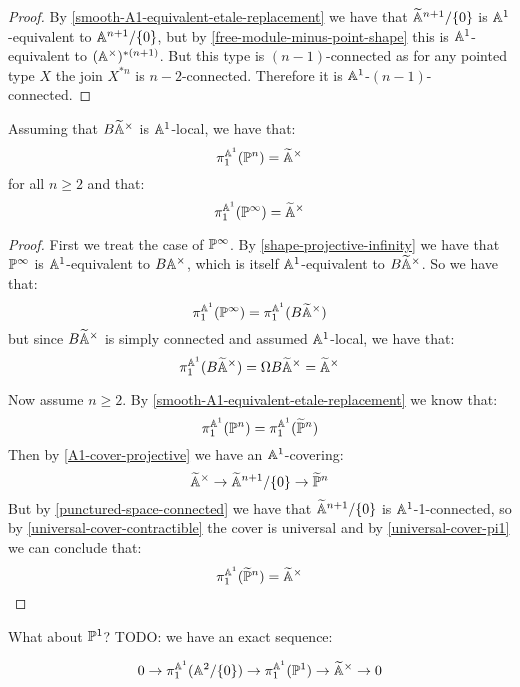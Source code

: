 \begin{proof}
By \cref{smooth-A1-equivalent-etale-replacement} we have that $\widetilde {\mathbb{A}}^{n+1}/\{0\}$ is $\mathbb{A}^1$-equivalent to $\mathbb{A}^{n+1}/\{0\}$, but by \cref{free-module-minus-point-shape} this is $\mathbb{A}^1$-equivalent to $(\mathbb{A}^\times)^{*(n+1)}$. But this type is $(n-1)$-connected as for any pointed type $X$ the join $X^{*n}$ is $n-2$-connected. Therefore it is $\mathbb{A}^1$-$(n-1)$-connected.
\end{proof}

\begin{lemma}
Assuming that $B\widetilde{\mathbb{A}}^\times$ is $\mathbb{A}^1$-local, we have that:
\[\pi^{\mathbb{A}^1}_1(\mathbb{P}^n) = \widetilde{\mathbb{A}}^\times\]
for all $n\geq 2$ and that:
\[\pi^{\mathbb{A}^1}_1(\mathbb{P}^\infty) = \widetilde{\mathbb{A}}^\times\]
\end{lemma}

\begin{proof}
First we treat the case of $\mathbb{P}^\infty$. By \cref{shape-projective-infinity} we have that $\mathbb{P}^\infty$ is $\mathbb{A}^1$-equivalent to $B\mathbb{A}^\times$, which is itself $\mathbb{A}^1$-equivalent to $B\widetilde{\mathbb{A}}^\times$. So we have that:
\[\pi_1^{\mathbb{A}^1}(\mathbb{P}^\infty) = \pi_1^{\mathbb{A}^1}(B\widetilde{\mathbb{A}}^\times)\]
but since $B\widetilde{\mathbb{A}}^\times$ is simply connected and assumed $\mathbb{A}^1$-local, we have that:
\[\pi_1^{\mathbb{A}^1}(B\widetilde{\mathbb{A}}^\times) = \Omega B\widetilde{\mathbb{A}}^\times = \widetilde{\mathbb{A}}^\times\]

Now assume $n\geq 2$. By \cref{smooth-A1-equivalent-etale-replacement} we know that:
\[\pi_1^{\mathbb{A}^1}(\mathbb{P}^n) = \pi_1^{\mathbb{A}^1}(\widetilde{\mathbb{P}}^n)\]
Then by \cref{A1-cover-projective} we have an $\mathbb{A}^1$-covering: 
\[\widetilde{\mathbb{A}}^\times \to \widetilde {\mathbb{A}}^{n+1}/\{0\} \to \widetilde{\mathbb{P}}^n\]
But by \cref{punctured-space-connected} we have that $\widetilde {\mathbb{A}}^{n+1}/\{0\}$ is $\mathbb{A}^1$-1-connected, so by \cref{universal-cover-contractible} the cover is universal and by \cref{universal-cover-pi1} we can conclude that:
\[\pi_1^{\mathbb{A}^1}(\widetilde{\mathbb{P}}^n) = \widetilde{\mathbb{A}}^\times\]
\end{proof}

What about $\mathbb{P}^1$? TODO: we have an exact sequence:

\[0\to \pi_1^{\mathbb{A}^1}(\mathbb{A}^2/\{0\}) \to \pi_1^{\mathbb{A}^1}(\mathbb{P}^1) \to \widetilde{\mathbb{A}}^\times\to 0\]
